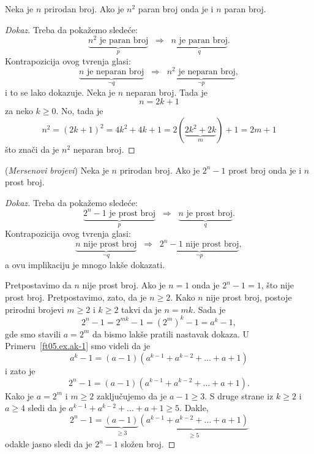 \begin{EX}\label{ft05.ex.n2-paran}
  Neka je $n$ prirodan broj. Ako je $n^2$ paran broj onda je i $n$ paran broj.
\end{EX}
\begin{proof}[Dokaz]
  Treba da poka\v zemo slede\'ce:
  $$
    \underbrace{n^2 \text{ je paran broj}}_p
    \;\;\Rightarrow\;\;
    \underbrace{n \text{ je paran broj}}_q.
  $$
  Kontrapozicija ovog tvr\dj enja glasi:
  $$
    \underbrace{n \text{ je neparan broj}}_{\lnot q}
    \;\;\Rightarrow\;\;
    \underbrace{n^2 \text{ je neparan broj}}_{\lnot p},
  $$
  i to se lako dokazuje. Neka je $n$ neparan broj. Tada je
  $$
    n = 2k + 1
  $$
  za neko $k \ge 0$. No, tada je
  $$
    n^2 = (2k + 1)^2 = 4k^2 + 4k + 1 = 2(\underbrace{2k^2 + 2k}_m) + 1 = 2m + 1
  $$
  \v sto zna\v ci da je $n^2$ neparan broj.
\end{proof}

\begin{EX}\label{ft05.ex.ak-1} (\emph{Mersenovi brojevi})
  Neka je $n$ prirodan broj. Ako je $2^n - 1$ prost broj onda je i $n$ prost broj.
\end{EX}
\begin{proof}[Dokaz]
  Treba da poka\v zemo slede\'ce:
  $$
    \underbrace{2^n - 1 \text{ je prost broj}}_p
    \;\;\Rightarrow\;\;
    \underbrace{n \text{ je prost broj}}_q.
  $$
  Kontrapozicija ovog tvr\dj enja glasi:
  $$
    \underbrace{n \text{ nije prost broj}}_{\lnot q}
    \;\;\Rightarrow\;\;
    \underbrace{2^n - 1 \text{ nije prost broj}}_{\lnot p},
  $$
  a ovu implikaciju je mnogo lak\v se dokazati.
  
  Pretpostavimo da $n$ nije prost broj. Ako je $n = 1$ onda je $2^n - 1 = 1$, \v sto nije prost broj.
  Pretpostavimo, zato, da je $n \ge 2$. Kako $n$ nije prost broj, postoje prirodni brojevi $m \ge 2$ i $k \ge 2$
  takvi da je $n = mk$. Sada je
  $$
    2^n - 1 = 2^{mk} - 1 = (2^m)^k - 1 = a^k - 1,
  $$
  gde smo stavili $a = 2^m$ da bismo lak\v se pratili nastavak dokaza.
  U Primeru~\ref{ft05.ex.ak-1} smo videli da je
  $$
    a^k - 1 = (a - 1)(a^{k-1} + a^{k-2} + \ldots + a + 1)
  $$
  i zato je
  $$
    2^n - 1 = (a - 1)(a^{k-1} + a^{k-2} + \ldots + a + 1).
  $$
  Kako je $a = 2^m$ i $m \ge 2$ zaklju\v cujemo da je $a - 1 \ge 3$. S druge strane iz $k \ge 2$ i $a \ge 4$ sledi da je
  $a^{k-1} + a^{k-2} + \ldots + a + 1 \ge 5$. Dakle,
  $$
    2^n - 1 = \underbrace{(a - 1)}_{\ge 3}\underbrace{(a^{k-1} + a^{k-2} + \ldots + a + 1)}_{\ge 5}
  $$
  odakle jasno sledi da je $2^n - 1$ slo\v zen broj.
\end{proof}

